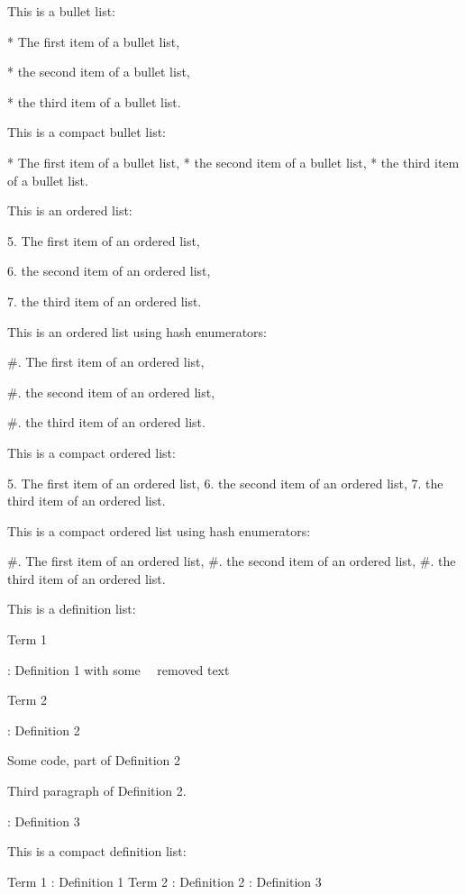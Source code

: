 This is a bullet list:

* The first item of a bullet list,

* the second item of a bullet list,

* the third item of a bullet list.

This is a compact bullet list:

* The first item of a bullet list,
* the second item of a bullet list,
* the third item of a bullet list.

This is an ordered list:

5. The first item of an ordered list,

6. the second item of an ordered list,

7. the third item of an ordered list.

This is an ordered list using hash enumerators:

#. The first item of an ordered list,

#. the second item of an ordered list,

#. the third item of an ordered list.

This is a compact ordered list:

5. The first item of an ordered list,
6. the second item of an ordered list,
7. the third item of an ordered list.

This is a compact ordered list using hash enumerators:

#. The first item of an ordered list,
#. the second item of an ordered list,
#. the third item of an ordered list.

This is a definition list:

Term 1

:   Definition 1 with some ~~removed text~~

Term 2

:   Definition 2

        Some code, part of Definition 2

    Third paragraph of Definition 2.

:   Definition 3

This is a compact definition list:

Term 1
:   Definition 1
Term 2
:   Definition 2
:   Definition 3

\markdownEnd

\bye
